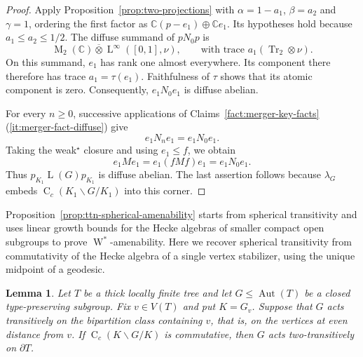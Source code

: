 \documentclass[11pt]{amsart}
\numberwithin{equation}{section}
\newcommand{\cc}{\mathbb C}
\newcommand{\pt}{\otimes}
\newcommand{\ovt}{\mathbin{\overline{\otimes}}}
\DeclareMathOperator{\LL}{L}
\DeclareMathOperator{\Aut}{Aut}
\DeclareMathOperator{\Tr}{Tr}
\newcommand{\Wstar}{\operatorname{W}^*}
\newcommand{\rC}{\operatorname{C}}
\newcommand{\rL}{\operatorname{L}}
\newcommand{\rM}{\operatorname{M}}
\newcommand{\Hk}[2]{\rC_c(#2\backslash #1/#2)}
\newtheorem{Lem}[The]{Lemma}
\theoremstyle{definition}
\begin{document}
\begin{proof}
    Apply Proposition~\ref{prop:two-projections} with $\alpha=1-a_1$, $\beta=a_2$ and $\gamma=1$, ordering the first factor as $\cc(p-e_1)\oplus\cc e_1$. Its hypotheses hold because $a_1\leq a_2\leq1/2$. The diffuse summand of $pN_0p$ is
    $$
        \rM_2(\cc)\ovt\rL^\infty([0,1],\nu),
        \qquad\text{with trace }a_1(\Tr_2\pt\nu).
    $$
    On this summand, $e_1$ has rank one almost everywhere. Its component there therefore has trace $a_1=\tau(e_1)$. Faithfulness of $\tau$ shows that its atomic component is zero. Consequently, $e_1N_0e_1$ is diffuse abelian.

    For every $n\geq0$, successive applications of Claims~\ref{fact:merger-key-facts}\textup{(\ref*{it:merger-fact-diffuse})} give
    $$
        e_1N_ne_1=e_1N_0e_1.
    $$
    Taking the weak$^\star$ closure and using $e_1\leq f$, we obtain
    $$
        e_1Me_1=e_1(fMf)e_1=e_1N_0e_1.
    $$
    Thus $p_{K_1}\LL(G)p_{K_1}$ is diffuse abelian. The last assertion follows because $\lambda_G$ embeds $\Hk G{K_1}$ into this corner.
\end{proof}

Proposition~\ref{prop:ttn-spherical-amenability} starts from spherical transitivity and uses linear growth bounds for the Hecke algebras of smaller compact open subgroups to prove $\Wstar$-amenability. Here we recover spherical transitivity from commutativity of the Hecke algebra of a single vertex stabilizer, using the unique midpoint of a geodesic.

\begin{Lem}
    \label{lem:commutative-hecke-boundary}
    Let $T$ be a thick locally finite tree and let $G\leq\Aut(T)$ be a closed type-preserving subgroup. Fix $v\in V(T)$ and put $K=G_v$. Suppose that $G$ acts transitively on the bipartition class containing $v$, that is, on the vertices at even distance from $v$. If $\Hk GK$ is commutative, then $G$ acts two-transitively on $\partial T$.
\end{Lem}
\end{document}
